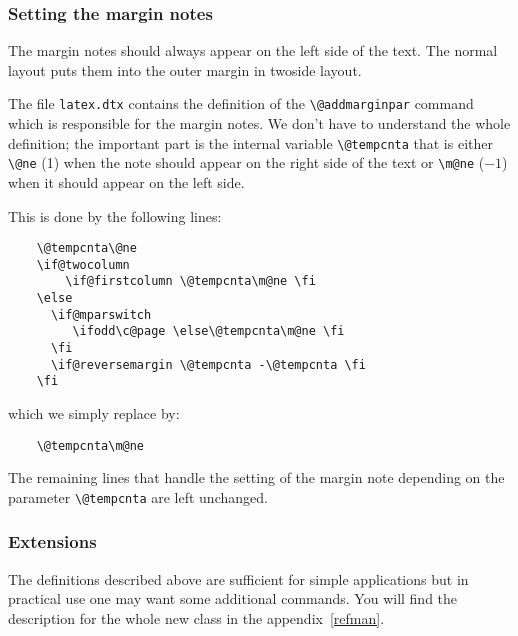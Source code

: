 \documentclass[twoside,a4paper]{refart}
\begin{document}
\vspace{0pt plus 1cm}

\subsubsection{Setting the margin notes}

The margin notes should always appear on the left side of the text. 
The normal layout puts them into the outer margin in twoside layout.

The file \texttt{latex.dtx} contains the definition of the 
\verb|\@addmarginpar| command which is responsible for the margin 
notes. We don't have to understand the whole definition; the important 
part is the internal variable \verb|\@tempcnta| that is either 
\verb|\@ne| (1) when the note should appear on the right side of the 
text or \verb|\m@ne| ($-1$) when it should appear on the left side.

This is done by the following lines:
\begin{verbatim}
    \@tempcnta\@ne
    \if@twocolumn
        \if@firstcolumn \@tempcnta\m@ne \fi
    \else
      \if@mparswitch
         \ifodd\c@page \else\@tempcnta\m@ne \fi
      \fi
      \if@reversemargin \@tempcnta -\@tempcnta \fi
    \fi
\end{verbatim}

which we simply replace by:
\begin{verbatim}
    \@tempcnta\m@ne
\end{verbatim}

The remaining lines that handle the setting of the margin note 
depending on the parameter \verb|\@tempcnta| are left unchanged.

\subsubsection{Extensions}

The definitions described above are sufficient for simple applications 
but in practical use one may want some additional commands.  
 You will find the description for the whole new 
class in the appendix~\ref{refman}.





\printindex
\end{document}
